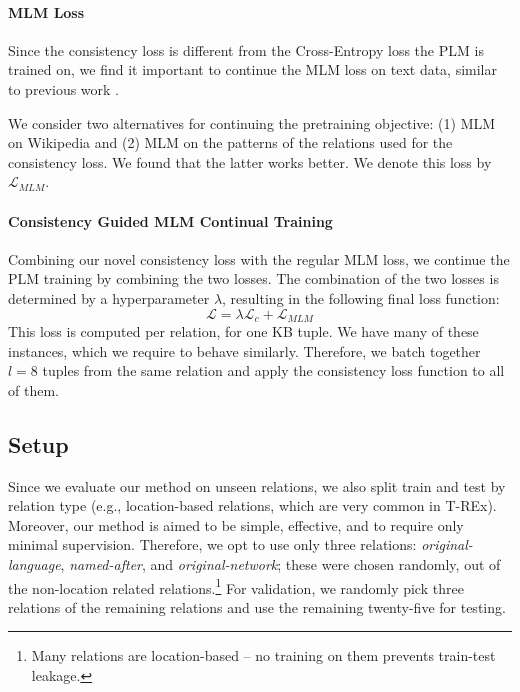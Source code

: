 \paragraph{MLM Loss}
Since the consistency loss is different from the
Cross-Entropy loss the PLM is trained on, we find it
important to continue the MLM loss on text data, similar to previous work \cite{geva2020injecting}.

We consider two alternatives for continuing the pretraining objective: (1) MLM on Wikipedia and (2) MLM on the patterns of the relations used for the consistency loss. We found that the latter works better. We denote this loss by $\mathcal{L}_{MLM}$.


\paragraph{Consistency Guided MLM Continual Training}

Combining our novel consistency loss with
the regular MLM loss, we continue the PLM training by
combining the two losses. The combination of the two losses
is determined by a hyperparameter $\lambda$, resulting in
the following final loss function:
\[
\mathcal{L} = \lambda \mathcal{L}_c + \mathcal{L}_{MLM}
\]
This loss is computed per relation, for one KB tuple. We have many of these instances, which we require to behave similarly. Therefore, we batch together $l=8$ tuples from the same relation and apply the consistency loss function to all of them.




\subsection{Setup}


Since we evaluate our method on unseen relations, we also
split train and test by relation type (e.g., location-based relations, which are very common
in T-REx).  Moreover, our method is aimed to be simple,
effective, and to require only minimal supervision. Therefore,
we opt to use only three relations:
\textit{original-language}, \textit{named-after}, and
\textit{original-network}; these were chosen randomly, out of
the non-location related relations.\footnote{Many
  relations are location-based -- no training on them prevents train-test leakage.} 
For validation, we randomly pick three
relations of the remaining relations and use the remaining
twenty-five for testing.

